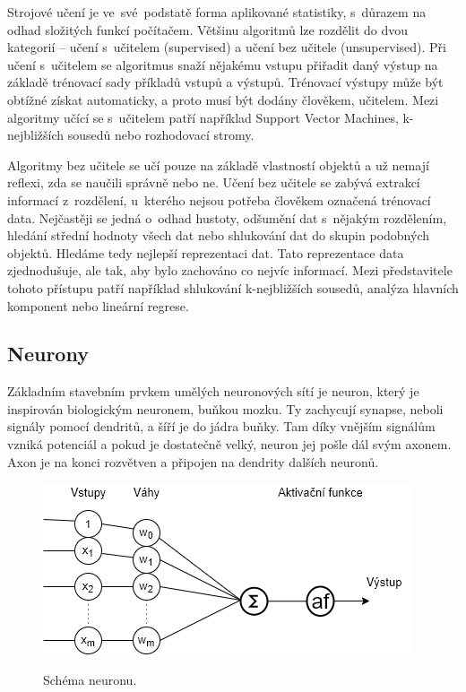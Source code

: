 Strojové učení je ve~své~podstatě forma aplikované statistiky,
s~důrazem na odhad složitých funkcí počítačem.
Většinu algoritmů lze rozdělit do dvou kategorií --
učení s~učitelem (supervised) 
a učení bez učitele (unsupervised).
Při učení s~učitelem se algoritmus snaží nějakému vstupu přiřadit daný výstup
na základě trénovací sady příkladů vstupů a výstupů.
Trénovací výstupy může být obtížné získat automaticky,
a proto musí být dodány člověkem, učitelem.
Mezi algoritmy učící se s~učitelem patří například Support Vector Machines,
k-nejbližších sousedů nebo rozhodovací stromy.
\cite{Goodfellow-et-al-2016}
\par

Algoritmy bez učitele se učí pouze na základě vlastností objektů 
a už nemají reflexi, zda se naučili správně nebo ne.
Učení bez učitele se zabývá extrakcí informací z~rozdělení,
u~kterého nejsou potřeba člověkem označená trénovací data.
Nejčastěji se jedná o~odhad hustoty, 
odšumění dat s~nějakým rozdělením,
hledání střední hodnoty všech dat 
nebo shlukování dat do skupin podobných objektů.
Hledáme tedy nejlepší reprezentaci dat.
Tato reprezentace data zjednodušuje, ale tak, 
aby bylo zachováno co nejvíc informací.
Mezi představitele tohoto přístupu patří například 
shlukování k-nejbližších sousedů, 
analýza hlavních komponent nebo lineární regrese. 
\cite{Goodfellow-et-al-2016}

\subsection*{Neurony}
Základním stavebním prvkem umělých neuronových sítí je neuron,
který je inspirován biologickým neuronem, buňkou mozku.
Ty zachycují synapse, neboli signály pomocí dendritů, 
a šíří je do jádra buňky.
Tam díky vnějším signálům vzniká potenciál 
a pokud je dostatečně velký, 
neuron jej pošle dál svým axonem.
Axon je na konci rozvětven 
a připojen na dendrity dalších neuronů.

\begin{figure}[h]\centering
    \centering
    \includegraphics[width=0.6\linewidth]{obrazky/neuronSchema.png}\\[1pt]  
    \caption{Schéma neuronu.}    
    \label{obrazekSchemaNeuronu}
\end{figure}

